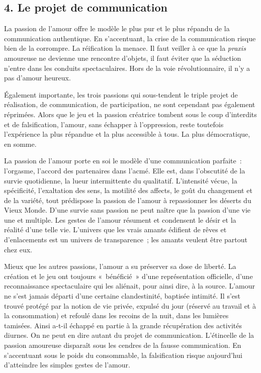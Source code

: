 \documentclass[french,twoside]{book} %
\begin{document}
\subsection[{4. Le projet de communication}]{\textsc{4. }Le projet de communication}
\noindent La passion de l’amour offre le modèle le plus pur et le plus répandu de la communication authentique. En s’accentuant, la crise de la communication risque bien de la corrompre. La réification la menace. Il faut veiller à ce que la \emph{praxis} amoureuse ne devienne une rencontre d’objets, il faut éviter que la séduction n’entre dans les conduits spectaculaires. Hors de la voie révolutionnaire, il n’y a pas d’amour heureux.\par
Également importante, les trois passions qui sous-tendent le triple projet de réalisation, de communication, de participation, ne sont cependant pas également réprimées. Alors que le jeu et la passion créatrice tombent sous le coup d’interdits et de falsification, l’amour, sans échapper à l’oppression, reste toutefois l’expérience la plus répandue et la plus accessible à tous. La plus démocratique, en somme.\par
La passion de l’amour porte en soi le modèle d’une communication parfaite : l’orgasme, l’accord des partenaires dans l’acmé. Elle est, dans l’obscutité de la survie quotidienne, la lueur intermittente du qualitatif. L’intensité vécue, la spécificité, l’exaltation des sens, la motilité des affects, le goût du changement et de la variété, tout prédispose la passion de l’amour à repassionner les déserts du Vieux Monde. D’une survie sans passion ne peut naître que la passion d’une vie une et multiple. Les gestes de l’amour résument et condensent le désir et la réalité d’une telle vie. L’univers que les vrais amants édifient de rêves et d’enlacements est un univers de transparence ; les amants veulent être partout chez eux.\par
Mieux que les autres passions, l’amour a su préserver sa dose de liberté. La création et le jeu ont toujours « bénéficié » d’une représentation officielle, d’une reconnaissance spectaculaire qui les aliénait, pour ainsi dire, à la source. L’amour ne s’est jamais départi d’une certaine clandestinité, baptisée intimité. Il s’est trouvé protégé par la notion de vie privée, expulsé du jour (réservé au travail et à la consommation) et refoulé dans les recoins de la nuit, dans les lumières tamisées. Ainsi a-t-il échappé en partie à la grande récupération des activités diurnes. On ne peut en dire autant du projet de communication. L’étincelle de la passion amoureuse disparaît sous les cendres de la fausse communication. En s’accentuant sous le poids du consommable, la falsification risque aujourd’hui d’atteindre les simples gestes de l’amour.\par
\end{document}
